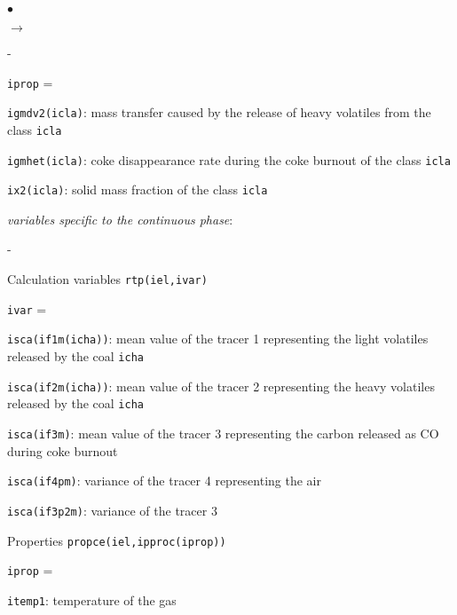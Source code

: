 {{{\begin{list}{$\bullet$}{}
\begin{list}{$\rightarrow$}{}
\begin{list}{}{}
\begin{list}{-}{}
\begin{list}{\texttt{iprop} = }{}
                      \item \texttt{igmdv2(icla)}: mass transfer
                            caused by the release of heavy volatiles
                            from the class \texttt{icla}
                      \item \texttt{igmhet(icla)}: coke
                            disappearance rate during the coke burnout
                            of the class \texttt{icla}
                      \item \texttt{ix2(icla)}: solid mass fraction
                            of the class \texttt{icla}
                     \end{list}
              \end{list}
              \item {\em variables specific to the continuous phase}:
              \begin{list}{-}{}
               \item Calculation variables \texttt{rtp(iel,ivar)}
                     \begin{list}{\texttt{ivar} = }{}
                      \item \texttt{isca(if1m(icha))}: mean value of
                            the tracer 1 representing the light
                            volatiles released by the coal \texttt{icha}
                      \item \texttt{isca(if2m(icha))}: mean value of
                            the tracer 2 representing the heavy
                            volatiles released by the coal \texttt{icha}
                      \item \texttt{isca(if3m)}: mean value of the
                            tracer 3 representing the carbon released as
                            CO during coke burnout
                      \item \texttt{isca(if4pm)}: variance of the
                            tracer 4 representing the air
                      \item \texttt{isca(if3p2m)}: variance of the
                            tracer 3
                     \end{list}
               \item Properties \texttt{propce(iel,ipproc(iprop))}
                     \begin{list}{\texttt{iprop} = }{}
                      \item \texttt{itemp1}: temperature of the gas

\end{list}
\end{list}
\end{list}
\end{list}
\end{list}}}}
